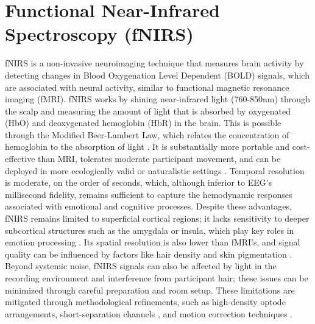 \section{Functional Near-Infrared Spectroscopy (fNIRS)}
fNIRS is a non-invasive neuroimaging technique that measures brain activity by detecting changes in Blood Oxygenation Level Dependent (BOLD) signals, which are associated with neural activity, similar to functional magnetic resonance imaging (fMRI).
fNIRS works by shining near-infrared light (760-850nm) through the scalp and measuring the amount of light that is absorbed by oxygenated (HbO) and deoxygenated hemoglobin (HbR) in the brain.
This is possible through the Modified Beer-Lambert Law, which relates the concentration of hemoglobin to the absorption of light \citep{kocsis_modified_2006}.
It is substantially more portable and cost-effective than MRI, tolerates moderate participant movement, and can be deployed in more ecologically valid or naturalistic settings \citep{yucel_functional_2017}. 
Temporal resolution is moderate, on the order of seconds, which, although inferior to EEG's millisecond fidelity, remains sufficient to capture the hemodynamic responses associated with emotional and cognitive processes. 
Despite these advantages, fNIRS remains limited to superficial cortical regions; it lacks sensitivity to deeper subcortical structures such as the amygdala or insula, which play key roles in emotion processing \citep{sato_amygdala_2004}. 
Its spatial resolution is also lower than fMRI's, and signal quality can be influenced by factors like hair density and skin pigmentation \citep{holmes_opening_2024}. 
Beyond systemic noise, fNIRS signals can also be affected by light in the recording environment and interference from participant hair; these issues can be minimized through careful preparation and room setup.
These limitations are mitigated through methodological refinements, such as high-density optode arrangements, short-separation channels \citep{scholkmann_measuring_2014}, and motion correction techniques \citep{fishburn_temporal_2019, bergmann_evaluation_2023}. 

